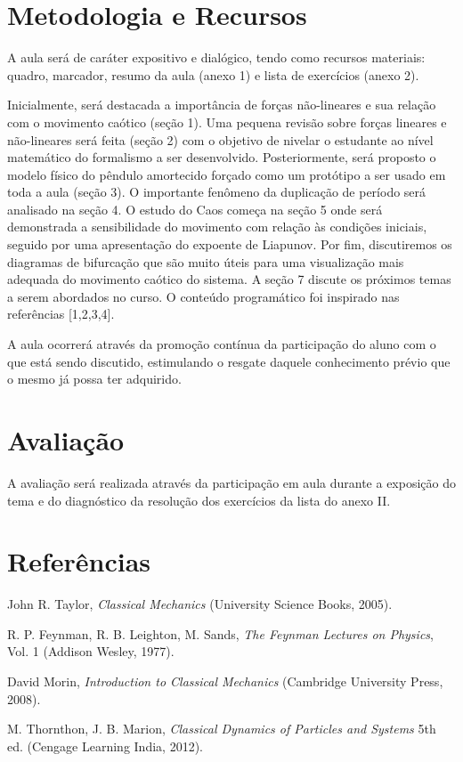 \documentclass{article}
\begin{document}
\section{Metodologia e Recursos}

A aula será de caráter expositivo e dialógico, tendo como recursos materiais: quadro, marcador, resumo da aula (anexo 1) e lista de exercícios (anexo 2).

Inicialmente, será destacada a importância de forças não-lineares e sua relação com o movimento caótico (seção 1). Uma pequena revisão sobre forças lineares e não-lineares será feita (seção 2) com o objetivo de nivelar o estudante ao nível matemático do formalismo a ser desenvolvido. Posteriormente, será proposto o modelo físico do pêndulo amortecido forçado como um protótipo a ser usado em toda a aula (seção 3). O importante fenômeno da duplicação de período será analisado na seção 4. O estudo do Caos começa na seção 5 onde será demonstrada a sensibilidade do movimento com relação às condições iniciais, seguido por uma apresentação do expoente de Liapunov. Por fim, discutiremos os diagramas de bifurcação que são muito úteis para uma visualização mais adequada do movimento caótico do sistema. A seção 7 discute os próximos temas a serem abordados no curso. O conteúdo programático foi inspirado nas referências [1,2,3,4].

A aula ocorrerá através da promoção contínua da participação do aluno com o que está sendo discutido, estimulando o resgate daquele conhecimento prévio que o mesmo já possa ter adquirido.

\section{Avaliação}

A avaliação será realizada através da participação em aula durante a exposição do tema e do diagnóstico da resolução dos exercícios da lista do anexo II. 

\section{Referências}

\noindent [1] John R. Taylor, \textit{Classical Mechanics} (University Science Books, 2005).

\noindent [2] R. P. Feynman, R. B. Leighton, M. Sands, \textit{The Feynman Lectures on Physics}, Vol. 1 (Addison Wesley, 1977).

\noindent [3] David Morin, \textit{Introduction to Classical Mechanics} (Cambridge University Press, 2008).

\noindent [4] M. Thornthon, J. B. Marion, \textit{Classical Dynamics of Particles and Systems} 5th ed. (Cengage Learning India, 2012).
\end{document}
